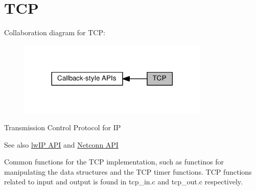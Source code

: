 \hypertarget{group__tcp__raw}{}\section{T\+CP}
\label{group__tcp__raw}
Collaboration diagram for T\+CP\+:
\nopagebreak
\begin{figure}[H]
\begin{center}
\leavevmode
\includegraphics[width=257pt]{group__tcp__raw}
\end{center}
\end{figure}
Transmission Control Protocol for IP~\newline
\begin{DoxySeeAlso}{See also}
\hyperlink{raw_api}{lw\+IP A\+PI} and \hyperlink{group__netconn}{Netconn A\+PI}
\end{DoxySeeAlso}
Common functions for the T\+CP implementation, such as functinos for manipulating the data structures and the T\+CP timer functions. T\+CP functions related to input and output is found in tcp\+\_\+in.\+c and tcp\+\_\+out.\+c respectively.~\newline
